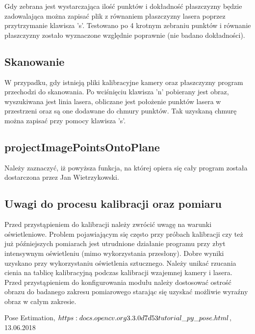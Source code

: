 \documentclass[conference]{IEEEtran}
\begin{document}
Gdy zebrana jest wystarczająca ilość punktów i dokładność płaszczyzny będzie zadowalająca można zapisać plik z równaniem płaszczyzny lasera poprzez przytrzymanie klawisza 's'.
Testowano po 4 krotnym zebraniu punktów i równanie płaszczyzny zostało wyznaczone względnie poprawnie (nie badano dokładności).

\subsection{Skanowanie}

W przypadku, gdy istnieją pliki kalibracyjne kamery oraz płaszczyzny program przechodzi do skanowania. Po wciśnięciu klawisza 'n' pobierany jest obraz, wyszukiwana jest linia lasera, obliczane jest położenie punktów lasera w przestrzeni oraz są one dodawane do chmury punktów. Tak uzyskaną chmurę można zapisać przy pomocy klawisza 's'.

\subsection{projectImagePointsOntoPlane}

Należy zaznaczyć, iż powyższa funkcja, na której opiera się cały program została dostarczona przez Jan Wietrzykowski.

\subsection{Uwagi do procesu kalibracji oraz pomiaru}

Przed przystąpieniem do kalibracji należy zwrócić uwagę na warunki oświetleniowe. Problem pojawiającym się często przy próbach kalibracji czy też już późniejszych pomiarach jest utrudnione działanie programu przy zbyt intensywnym oświetleniu (mimo wykorzystania przesłony). Dobre wyniki uzyskano przy wykorzystaniu oświetlenia sztucznego. Należy unikać rzucania cienia na tablicę kalibracyjną podczas kalibracji wzajemnej kamery i lasera. Przed przystąpieniem do konfigurowania modułu należy dostosować ostrość obrazu do badanego zakresu pomiarowego starając się uzyskać możliwie wyraźny obraz w całym zakresie.

\begin{thebibliography}{00}
Pose Estimation, $https:\/\/docs.opencv.org\/3.3.0\/d7\/d53\/tutorial\_py\_pose.html$, 13.06.2018

\end{thebibliography}
\end{document}
